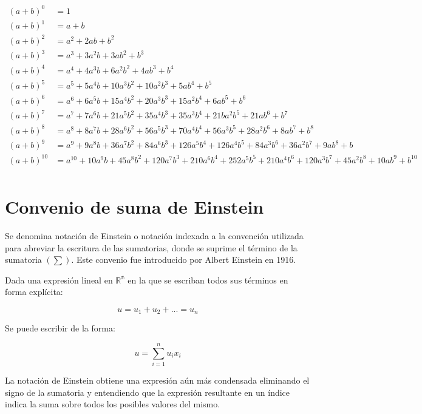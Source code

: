 \documentclass{article}
\begin{document}
\begin{landscape}
	\begin{equation}
		\begin{split}
			(a+b)^0 &= 1 \\
			(a+b)^1 &= a+b \\
			(a+b)^2 &= a^2+2ab+b^2 \\
			(a+b)^3 &= a^3+3a^2b+3ab^2+b^3 \\
			(a+b)^4 &= a^4+4a^3b+6a^2b^2+4ab^3+b^4 \\
			(a+b)^5 &= a^5+5a^4b+10a^3b^2+10a^2b^3+5ab^4+b^5\\
			(a+b)^6 &= a^6+6a^5b+15a^4b^2+20a^3b^3+15a^2b^4+6ab^5+b^6\\
			(a+b)^7 &= a^7+7a^6b+21a^5b^2+35a^4b^3+35a^3b^4+21ba^2b^5+21ab^6+b^7 \\
			(a+b)^8 &= a^8+8a^7b+28a^6b^2+56a^5b^3+70a^4b^4+56a^3b^5+28a^2b^6+8ab^7+b^8 \\
			(a+b)^9 &= a^9+9a^8b+36a^7b^2+84a^6b^3+126a^5b^4+126a^4b^5+84a^3b^6+36a^2b^7+9ab^8+b \\
			(a+b)^{10} &= a^{10}+10a^9b+45a^8b^2+120a^7b^3+210a^6b^4+252a^5b^5+210a^4b^6+120a^3b^7+45a^2b^8+10ab^9+b^{10} \\
		\end{split}
	\end{equation}
\end{landscape}

\section{Convenio de suma de Einstein}

Se denomina notación de Einstein o notación indexada a la convención utilizada
para abreviar la escritura de las sumatorias, donde se suprime el término de la
sumatoria $(\sum)$. Este convenio fue introducido por Albert Einstein en 1916.

Dada una expresión lineal en $\mathbb{R^n}$ en la que se escriban todos sus
términos en forma explícita:

\begin{equation}
    u = u_1 + u_2 + ... = u_n
\end{equation}

Se puede escribir de la forma:

\begin{equation}
    u = \sum_{i=1}^{n} u_ix_i
\end{equation}

La notación de Einstein obtiene una expresión aún más condensada eliminando el
signo de la sumatoria y entendiendo que la expresión resultante en un índice
indica la suma sobre todos los posibles valores del mismo.
\end{document}
